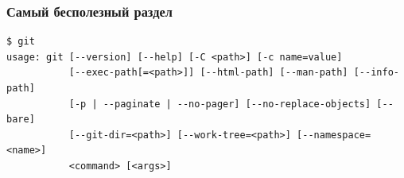 \documentclass[pdf,russian]{beamer}
\begin{document}
\begin{frame}[fragile]
    \frametitle{Самый бесполезный раздел}
    \pause
    \center
    \onslide<+->
    \begin{Verbatim}[fontsize=\relsize{-3}]
$ git
usage: git [--version] [--help] [-C <path>] [-c name=value]
           [--exec-path[=<path>]] [--html-path] [--man-path] [--info-path]
           [-p | --paginate | --no-pager] [--no-replace-objects] [--bare]
           [--git-dir=<path>] [--work-tree=<path>] [--namespace=<name>]
           <command> [<args>]


\end{Verbatim}
\end{frame}
\end{document}
